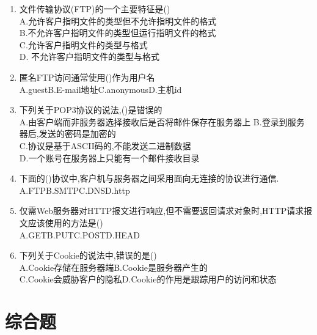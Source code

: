\documentclass[12pt, a4paper, oneside, UTF8]{ctexbook}
\begin{document}
\begin{enumerate}
    \item 文件传输协议(FTP)的一个主要特征是() \\
    A.允许客户指明文件的类型但不允许指明文件的格式 \\
    B.不允许客户指明文件的类型但运行指明文件的格式 \\
    C.允许客户指明文件的类型与格式 \\
    D. 不允许客户指明文件的类型与格式 

    \item 匿名FTP访问通常使用()作为用户名 \\
    A.guest\qquad B.E-mail地址\qquad C.anonymous\qquad D.主机id

    \item 下列关于POP3协议的说法,()是错误的 \\
    A.由客户端而非服务器选择接收后是否将邮件保存在服务器上
    B.登录到服务器后,发送的密码是加密的 \\
    C.协议是基于ASCII码的,不能发送二进制数据 \\
    D.一个账号在服务器上只能有一个邮件接收目录 

    \item 下面的()协议中,客户机与服务器之间采用面向无连接的协议进行通信. \\
    A.FTP\qquad B.SMTP\qquad C.DNS\qquad D.http

    \item 仅需Web服务器对HTTP报文进行响应,但不需要返回请求对象时,HTTP请求报文应该使用的方法是() \\
    A.GET\qquad B.PUT\qquad C.POST\qquad D.HEAD

    \item 下列关于Cookie的说法中,错误的是() \\
    A.Cookie存储在服务器端\qquad B.Cookie是服务器产生的\\
    C.Cookie会威胁客户的隐私\qquad D.Cookie的作用是跟踪用户的访问和状态
\end{enumerate}


\section{综合题}

\ifx\allfiles\undefined
\end{document}
